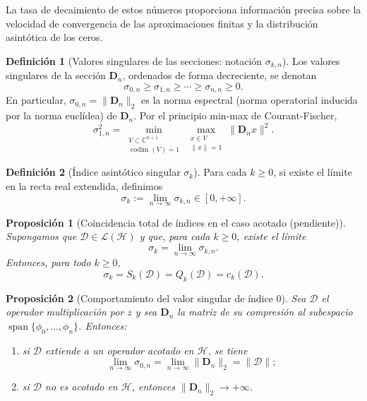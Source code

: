 \documentclass[12pt,a4paper]{article}
\newtheorem{proposition}{Proposición}
\theoremstyle{definition}
\newtheorem{definition}{Definición}
\theoremstyle{remark}
\begin{document}
La tasa de decaimiento de estos números proporciona información precisa sobre la velocidad de convergencia de las aproximaciones finitas y la distribución asintótica de los ceros.

\begin{definition}[Valores singulares de las secciones: notación $\sigma_{k,n}$]\label{def:sigma_kn}
	Los valores singulares de la sección $\mathbf{D}_n$, ordenados de forma decreciente, se denotan
	\[
		\sigma_{0,n} \geq \sigma_{1,n} \geq \cdots \geq \sigma_{n,n} \geq 0.
	\]
	En particular, $\sigma_{0,n} = \|\mathbf{D}_n\|_2$ es la norma espectral (norma operatorial inducida por la norma euclídea) de $\mathbf{D}_n$. Por el principio min-max de Courant-Fischer,
	\[
		\sigma_{1,n}^2 = \min_{\substack{V \subset \mathbb{C}^{n+1} \\ \operatorname{codim}(V) = 1}} \max_{\substack{x \in V \\ \|x\| = 1}} \|\mathbf{D}_n x\|^2.
	\]
\end{definition}

\begin{definition}[Índice asintótico singular $\sigma_k$]\label{def:indice_Sigma_k}
	Para cada $k\ge 0$, si existe el límite en la recta real extendida, definimos
	\[
		\sigma_k := \lim_{n\to\infty} \sigma_{k,n} \in [0,+\infty].
	\]
\end{definition}

\begin{proposition}[Coincidencia total de índices en el caso acotado (pendiente)]\label{prop:coincidencia_total_acotado_pendiente}
	Supongamos que $\mathcal{D}\in\mathcal{L}(\mathcal{H})$ y que, para cada $k\ge0$, existe el límite
	\[
		\sigma_k=\lim_{n\to\infty}\sigma_{k,n}.
	\]
	Entonces, para todo $k\ge0$,
	\[
		\sigma_k=S_k(\mathcal{D})=Q_k(\mathcal{D})=c_k(\mathcal{D}).
	\]
\end{proposition}

\begin{proposition}[Comportamiento del valor singular de índice $0$]\label{prop:convergencia_sigma}
	Sea $\mathcal{D}$ el operador multiplicación por $z$ y sea $\mathbf{D}_n$ la matriz de su compresión al subespacio $\operatorname{span}\{\phi_0,\dots,\phi_n\}$. Entonces:
	\begin{enumerate}
		\item si $\mathcal{D}$ extiende a un operador acotado en $\mathcal{H}$, se tiene
		      \[
			      \lim_{n \to \infty} \sigma_{0,n} = \lim_{n \to \infty} \|\mathbf{D}_n\|_2 = \|\mathcal{D}\|;
		      \]
		\item si $\mathcal{D}$ no es acotado en $\mathcal{H}$, entonces $\|\mathbf{D}_n\|_2 \to +\infty$.
	\end{enumerate}
\end{proposition}
\end{document}
